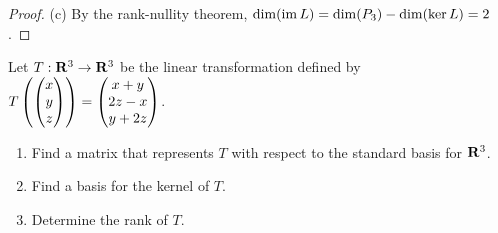 \documentclass[10pt,twoside,openany]{memoir}
\begin{document}
{\begin{proof}
        (c) By the rank-nullity theorem, $\dim (\operatorname{im} L) = \dim (P_3) - \dim (\ker L) = 2$.
    \end{proof}}
\begin{problem}[F18, P1]
    Let $T:\mathbf{R}^3 \rightarrow \mathbf{R}^3$ be the linear transformation defined by $T \left(\left( \begin{matrix} x \\ y \\ z \end{matrix} \right) \right) = \left( \begin{matrix} x+y \\ 2z-x \\ y+2z \end{matrix} \right)$.
        \begin{enumerate}[label = (\alph*),itemsep=1pt,topsep=3pt]
            \item Find a matrix that represents $T$ with respect to the standard basis for $\mathbf{R}^3$.
            \item Find a basis for the kernel of $T$.
            \item Determine the rank of $T$.
        \end{enumerate}
\end{problem}
\end{document}
